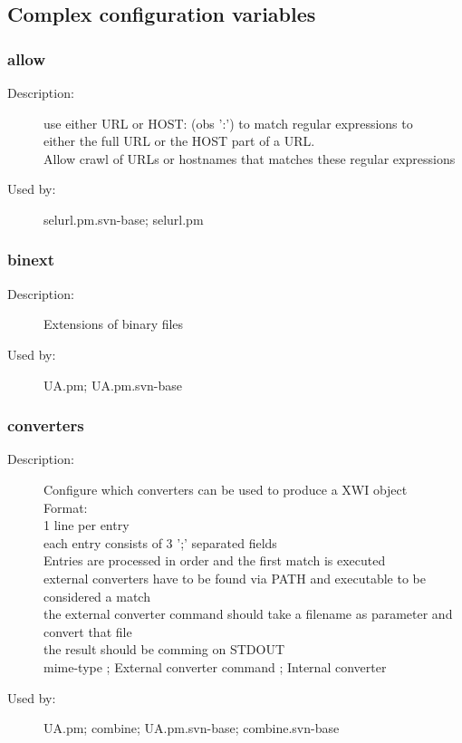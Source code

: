 \subsection{Complex configuration variables}
\subsubsection{allow}
\label{allow}
\begin{description}
\item[Description:] use either URL or HOST: (obs ':') to match regular expressions to \\  either the full URL or the HOST part of a URL. \\ Allow crawl of URLs or hostnames that matches these regular expressions
\item[Used by:] selurl.pm.svn-base; selurl.pm
\end{description}
\subsubsection{binext}
\label{binext}
\begin{description}
\item[Description:] Extensions of binary files
\item[Used by:] UA.pm; UA.pm.svn-base
\end{description}
\subsubsection{converters}
\label{converters}
\begin{description}
\item[Description:] Configure which converters can be used to produce a XWI object \\ Format: \\   1 line per entry \\   each entry consists of 3 ';' separated fields \\ Entries are processed in order and the first match is executed \\   external converters have to be found via PATH and executable to be considered a match \\   the external converter command should take a filename as parameter and convert that file \\    the result should be comming on STDOUT \\  mime-type   ;   External converter command ; Internal converter
\item[Used by:] UA.pm; combine; UA.pm.svn-base; combine.svn-base
\end{description}
